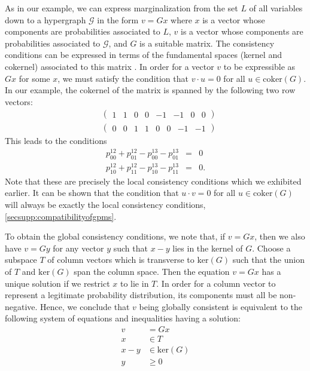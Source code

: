 As in our example, we can express marginalization from the set $L$ of
all variables down to a hypergraph $\mathcal{G}$ in the form $v = Gx$
where $x$ is a vector whose components are probabilities associated to
$L$, $v$ is a vector whose components are probabilities associated to
$\mathcal {G}$, and $G$ is a suitable matrix.  The consistency
conditions can be expressed in terms of the fundamental spaces (kernel
and cokernel) associated to this matrix \cite{Strang1993}.  In order for a vector $v$ to
be expressible as $Gx$ for some $x$, we must satisfy the condition
that $v\cdot u = 0$ for all $u \in \mathrm{coker} (G)$.  In our
example, the cokernel of the matrix is spanned by the following two
row vectors:
\begin{eqnarray}
 &\begin{pmatrix}
  1 & 1 & 0 & 0 & -1 & -1 & 0 & 0
 \end{pmatrix}\\
 &\begin{pmatrix}
 0 & 0 & 1 & 1 & 0 & 0 & -1 & -1
 \end{pmatrix}
\end{eqnarray}
This leads to the conditions
\begin{eqnarray}
 p^{12}_{00} + p^{12}_{01} - p^{13}_{00} - p^{13}_{01} &=& 0 \\
 p^{12}_{10} + p^{12}_{11} - p^{13}_{10} - p^{13}_{11} &=& 0 .
\end{eqnarray}
Note that these are precisely the local consistency conditions which we
exhibited earlier.  It can be shown that the condition that $u \cdot v
= 0$ for all $u \in \mathrm{coker} (G)$ will always be exactly the
local consistency conditions,  \ref{secsupp:compatibilityofgpms}.

To obtain the global consistency conditions, we note that, if $v =
Gx$, then we also have $v = Gy$ for any vector $y$ such that $x-y$
lies in the kernel of $G$.  Choose a subspace $T$ of column vectors
which is transverse to $\mathrm{ker}(G)$ such that the union of $T$
and $\mathrm{ker}(G)$ span the column space.  Then the equation $v =
Gx$ has a unique solution if we restrict $x$ to lie in $T$.  In order
for a column vector to represent a legitimate probability
distribution, its components must all be non-negative.  Hence, we
conclude that $v$ being globally consistent is equivalent to the
following system of equations and inequalities having a solution:
\begin{equation}
\begin{aligned}\label{eq:globalconsistencyconditions}
 v &= Gx \\
 x &\in T \\
 x - y &\in \mathrm{ker}(G) \\
 y &\ge 0
\end{aligned}
\end{equation}

